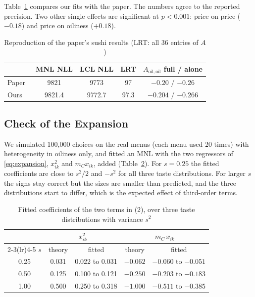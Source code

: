 \documentclass[11pt,journal,a4paper]{IEEEtran}
\newcommand{\Aoo}{A_{\mathrm{oil,oil}}}
\begin{document}
Table~\ref{tab:repro} compares our fits with the paper. The numbers agree to the reported precision. Two other
single effects are significant at $p<0.001$: price on price ($-0.18$) and price on oiliness ($+0.18$).

\begin{table}[!t]
\caption{Reproduction of the paper's sushi results (LRT: all 36 entries of $A$)}
\label{tab:repro}
\centering\footnotesize
\setlength{\tabcolsep}{3pt}
\begin{tabular}{lcccc}
\toprule
 & MNL NLL & LCL NLL & LRT & $\Aoo$ full / alone \\
\midrule
Paper~\cite{tb21} & 9821 & 9773 & 97 & $-0.20$ / $-0.26$ \\
Ours & 9821.4 & 9772.7 & 97.3 & $-0.204$ / $-0.266$ \\
\bottomrule
\end{tabular}
\end{table}

\subsection{Check of the Expansion}

We simulated 100,000 choices on the real menus (each menu used 20 times) with heterogeneity in oiliness only,
and fitted an MNL with the two regressors of \eqref{eq:expansion}, $x_{ik}^2$ and $m_Cx_{ik}$, added
(Table~\ref{tab:oracle}). For $s=0.25$ the fitted coefficients are close to $s^2/2$ and $-s^2$ for all three
taste distributions. For larger $s$ the signs stay correct but the sizes are smaller than predicted, and the
three distributions start to differ, which is the expected effect of third-order terms.

\begin{table}[!t]
\caption{Fitted coefficients of the two terms in (2), over three taste distributions with variance $s^2$}
\label{tab:oracle}
\centering\footnotesize
\setlength{\tabcolsep}{3.5pt}
\begin{tabular}{ccccc}
\toprule
 & \multicolumn{2}{c}{$x_{ik}^2$} & \multicolumn{2}{c}{$m_C\,x_{ik}$} \\
\cmidrule(lr){2-3}\cmidrule(lr){4-5}
$s$ & theory & fitted & theory & fitted \\
\midrule
0.25 & 0.031 & 0.022 to 0.031 & $-0.062$ & $-0.060$ to $-0.051$ \\
0.50 & 0.125 & 0.100 to 0.121 & $-0.250$ & $-0.203$ to $-0.183$ \\
1.00 & 0.500 & 0.250 to 0.318 & $-1.000$ & $-0.511$ to $-0.385$ \\
\bottomrule
\end{tabular}
\end{table}
\end{document}
